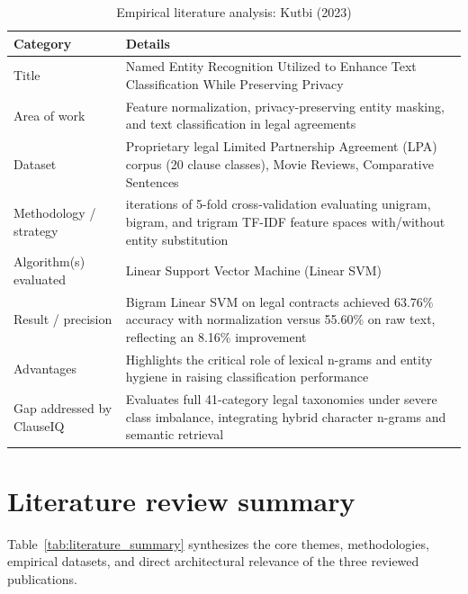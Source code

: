 \begin{table}[htbp]
\centering
\small
\begin{tabular}{>{\raggedright\arraybackslash}p{3.8cm} >{\raggedright\arraybackslash}p{11.0cm}}
\toprule
\textbf{Category} & \textbf{Details} \\
\midrule
Title & Named Entity Recognition Utilized to Enhance Text Classification While Preserving Privacy \\
Area of work & Feature normalization, privacy-preserving entity masking, and text classification in legal agreements \\
Dataset & Proprietary legal Limited Partnership Agreement (LPA) corpus (20 clause classes), Movie Reviews, Comparative Sentences \\
Methodology / strategy & 10 iterations of 5-fold cross-validation evaluating unigram, bigram, and trigram TF-IDF feature spaces with/without entity substitution \\
Algorithm(s) evaluated & Linear Support Vector Machine (Linear SVM) \\
Result / precision & Bigram Linear SVM on legal contracts achieved 63.76\% accuracy with normalization versus 55.60\% on raw text, reflecting an 8.16\% improvement \\
Advantages & Highlights the critical role of lexical n-grams and entity hygiene in raising classification performance \\
Gap addressed by ClauseIQ & Evaluates full 41-category legal taxonomies under severe class imbalance, integrating hybrid character n-grams and semantic retrieval \\
\bottomrule
\end{tabular}
\caption{Empirical literature analysis: Kutbi (2023)}\label{tab:lit_kutbi}
\end{table}

\clearpage
\section{Literature review summary}
\label{sec:literature_summary}

Table~\ref{tab:literature_summary} synthesizes the core themes, methodologies, empirical datasets, and direct architectural relevance of the three reviewed publications.


